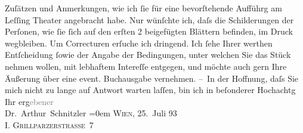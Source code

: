 \begin{ledgroupsized}[t]{13cm}
                    Zuſätzen und Anmerkungen, wie ich ſie für eine bevorſtehende Aufführg am Leſſing Theater angebracht habe. Nur wünſchte
                    ich, daſs die Schilderungen der Perſonen, wie ſie ſich auf den erſten 2
                    beigefügten Blättern befinden, im Druck wegbleiben.\pend
           \pstart
           {\pb}Um Correcturen erſuche ich dringend.\pend
           \pstart
           Ich ſehe Ihrer werthen Entſcheidung ſowie der Angabe der Bedingungen, unter
                    welchen Sie das Stück nehmen wollen, mit
                    lebhaftem Intereſſe entgegen, und möchte auch gern Ihre Äußerung über eine
                    event. Buchausgabe vernehmen.\pend
           \pstart
           – In der Hoffnung, daſs {\pb}Sie mich nicht zu lange auf
                    Antwort warten laſſen, bin ich in beſonderer Hochachtg\pend
           \pstart
           Ihr erg\textcolor{gray}{ebener}{\\[\baselineskip]}\spacefill\mbox{Dr. Arthur Schnitzler}\pend
           \leftskip=0em{}\pstart
           \textsc{Wien}, 25. Juli 93{\\}\textsc{I. Grillparzerstraße 7}\pend
                     \endnumbering{}\end{ledgroupsized}  \newcommand{\dateiname}{L00242}\newcommand{\titel}{Arthur Schnitzler an Samuel Fischer, 25. 7. 1893}\newcommand{\editorInnen}{Martin Anton Müller und Gerd-Hermann Susen}
            \footnotesize
\begin{ledgroupsized}[t]{11.5cm}
\end{ledgroupsized}
         
      